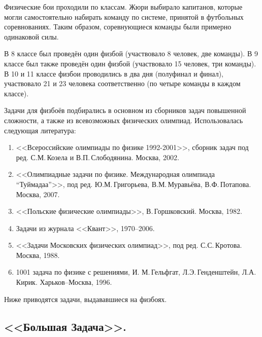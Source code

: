 \documentclass[12pt,a4paper,oneside,draft]{scrartcl}
\newlength{\h}
\begin{document}
Физические бои проходили по классам. Жюри выбирало капитанов, которые
могли самостоятельно набирать команду по системе, принятой в
футбольных соревнованиях. Таким образом, соревнующиеся команды были
примерно одинаковой силы.

В 8 классе был проведён один физбой (участвовало 8 человек, две
команды). В 9 классе был также проведён один физбой (участвовало 15
человек, три команды). В 10 и 11 классе физбои проводились в два дня
(полуфинал и финал), участвовало 21 и 23 человека соответственно
(по четыре команды в каждом классе). 

Задачи для физбоёв подбирались в основном из сборников задач повышенной
сложности, а также из всевозможных физических олимпиад. Использовалась
следующая литература: 

\begin{enumerate}
\item <<Всероссийские олимпиады по физике 1992-2001>>, сборник задач
  под ред. С.М.\,Ко\-зе\-ла и В.П.\,Слободянина. Москва, 2002.
\item <<Олимпиадные задачи по физике. Международная олимпиада
  ``Туймадаа''>>, под ред. Ю.М.\,Григорьева, В.М.\,Муравьёва,
  В.Ф.\,Потапова. Москва, 2007.
\item <<Польские физические олимпиады>>, В.\,Горшковский. Москва,
  1982.
\item Задачи из журнала <<Квант>>, 1970--2006. 
\item <<Задачи Московских физических олимпиад>>, под ред.
  С.С.\,Кротова. Москва, 1988.
\item 1001 задача по физике с решениями, И. М.\,Гельфгат, 
  Л.Э.\,Генденштейн, Л.А.\,Кирик. Харьков--Москва, 1996.
\end{enumerate}

Ниже приводятся задачи, выдававшиеся на физбоях. 















\parindent=5mm
\subsection{<<Большая Задача>>.}
\label{sec:bz}
\end{document}
